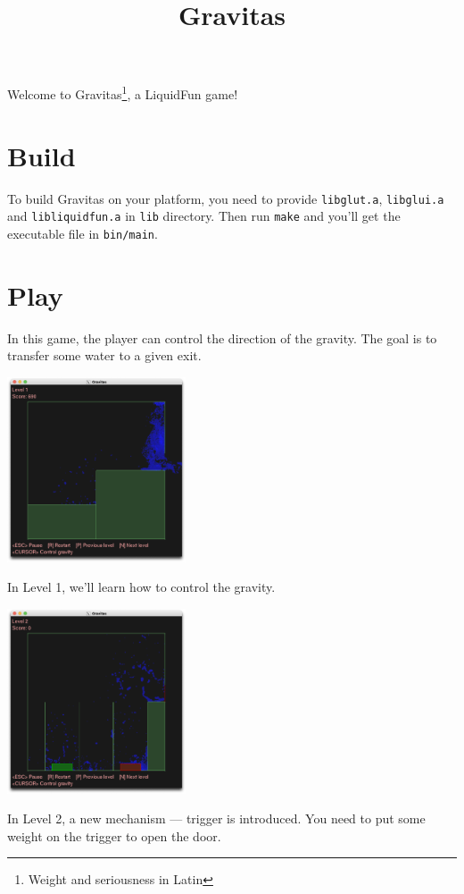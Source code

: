 \documentclass{article}
\title{Gravitas}
\author{}
\date{}
\begin{document}
\maketitle
Welcome to Gravitas\footnote{Weight and seriousness in Latin}, a LiquidFun game!

\section{Build}
To build Gravitas on your platform, you need to provide \verb|libglut.a|, \verb|libglui.a| and \verb|libliquidfun.a| in \verb|lib| directory. Then run \verb|make| and you'll get the executable file in \verb|bin/main|.
\section{Play}
In this game, the player can control the direction of the gravity.
The goal is to transfer some water to a given exit.

\begin{center}
\includegraphics[width=200px]{Level1.png}
\end{center}
In Level 1, we'll learn how to control the gravity.

\begin{center}
\includegraphics[width=200px]{Level2.png}
\end{center}
In Level 2, a new mechanism --- trigger is introduced.
You need to put some weight on the trigger to open the door.
\end{document}
